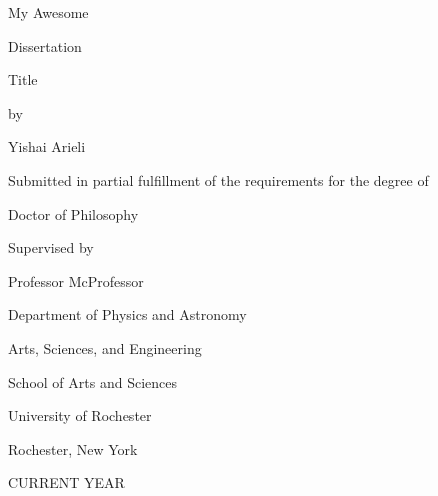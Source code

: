 \documentclass[\main/master.tex]{subfiles}
\begin{document}
\pagestyle{empty}
\begin{titlepage}
\doublespacing
\begin{center}
  {\titlefont My Awesome\par \vspace{10 mm}
   Dissertation \par \vspace{10 mm}
   Title}
   \vfill
   by\par
   \vfill
   Yishai Arieli\par
   \vspace{1.5in}
   Submitted in partial fulfillment of the requirements for the degree of\par
   \vfill
   Doctor of Philosophy\par
   \vfill
   Supervised by\par
   Professor McProfessor\par
   \vspace{1.5in}
   Department of Physics and Astronomy\par
   Arts, Sciences, and Engineering\par
   School of Arts and Sciences \par
   \vfill
   University of Rochester \par
   Rochester, New York \par
   CURRENT YEAR
   \end{center}
  \end{titlepage}
\end{document}
